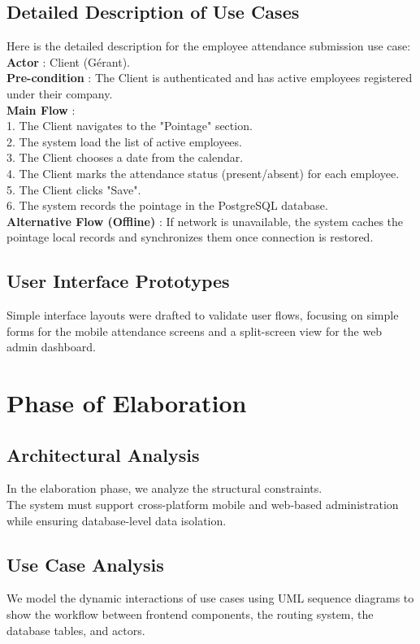 \subsection{Detailed Description of Use Cases}
Here is the detailed description for the employee attendance submission use case:\\
\textbf{Actor} :  Client (Gérant).\\
\textbf{Pre-condition} :  The Client is authenticated and has active employees registered \\ under their company.\\
\textbf{Main Flow} :
    \\1. The Client navigates to the "Pointage" section.
   \\2. The system load the list of active employees.
    \\3. The Client chooses a date from the calendar.
\\4. The Client marks the attendance status (present/absent) for each employee.
    \\5. The Client clicks "Save".
    \\6. The system records the pointage in the PostgreSQL database.\\
\textbf{Alternative Flow (Offline)} : If network is unavailable, the system caches the pointage local records and synchronizes them once connection is restored.

\subsection{User Interface Prototypes}
Simple interface layouts were drafted to validate user flows, focusing on simple forms for the mobile attendance screens and a split-screen view for the web admin dashboard.

\section{Phase of Elaboration}

\subsection{Architectural Analysis}
In the elaboration phase, we analyze the structural constraints.\\ The system must support cross-platform mobile and web-based administration while ensuring database-level data isolation.

\subsection{Use Case Analysis}
We model the dynamic interactions of use cases using UML sequence diagrams to show the workflow between frontend components, the routing system, the database tables, and actors.

